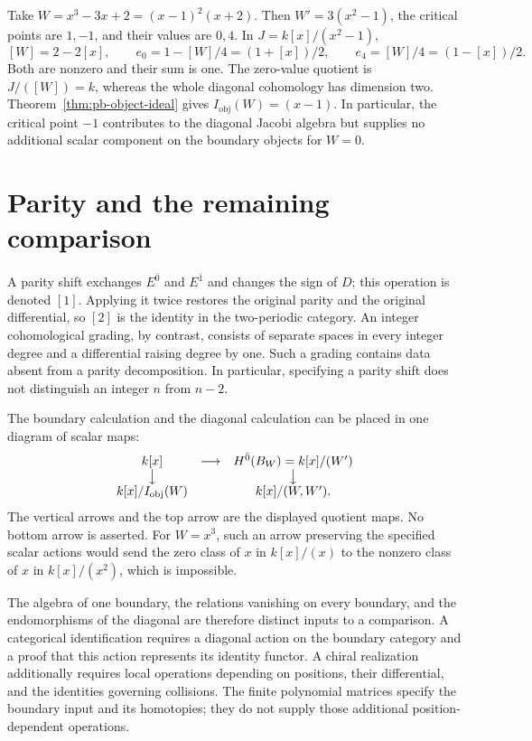 \begin{example}
\label{ex:pb-two-values}
Take \(W=x^3-3x+2=(x-1)^2(x+2)\).
Then \(W'=3(x^2-1)\), the critical points are \(1,-1\), and
their values are \(0,4\). In \(J=k[x]/(x^2-1)\),
\[
 [W]=2-2[x],\qquad
 e_0=1-[W]/4=(1+[x])/2,\qquad
 e_4=[W]/4=(1-[x])/2.
\]
Both are nonzero and their sum is one.
The zero-value quotient is \(J/([W])=k\), whereas
the whole diagonal cohomology has dimension two.
Theorem~\ref{thm:pb-object-ideal} gives
\(I_{\mathrm{obj}}(W)=(x-1)\). In particular, the critical point
\(-1\) contributes to the diagonal Jacobi algebra but supplies
no additional scalar component on the boundary objects for \(W=0\).
\end{example}

\section{Parity and the remaining comparison}
\label{sec:pb-parity-comparison}

A parity shift exchanges \(E^{\bar0}\) and \(E^{\bar1}\) and changes
the sign of \(D\); this operation is denoted \([1]\). Applying it
twice restores the original parity and the original differential,
so \([2]\) is the identity in the two-periodic category.
An integer cohomological grading, by contrast, consists of separate
spaces in every integer degree and a differential raising degree
by one. Such a grading contains data absent from a parity
decomposition. In particular, specifying a parity shift does not
distinguish an integer \(n\) from \(n-2\).

The boundary calculation and the diagonal calculation can be
placed in one diagram of scalar maps:
\[
\begin{array}{ccc}
 k[x] &\longrightarrow& H^{\bar0}(B_W)=k[x]/(W')\\
 \big\downarrow && \big\downarrow\\
 k[x]/I_{\mathrm{obj}}(W)&& k[x]/(W,W').
\end{array}
\]
The vertical arrows and the top arrow are the displayed quotient
maps. No bottom arrow is asserted. For \(W=x^3\), such an arrow
preserving the specified scalar actions would send the zero class
of \(x\) in \(k[x]/(x)\) to the nonzero class of \(x\) in
\(k[x]/(x^2)\), which is impossible.

The algebra of one boundary, the relations vanishing on every
boundary, and the endomorphisms of the diagonal are therefore
distinct inputs to a comparison. A categorical identification
requires a diagonal action on the boundary category and a proof
that this action represents its identity functor. A chiral
realization additionally requires local operations depending on
positions, their differential, and the identities governing
collisions. The finite polynomial matrices specify the boundary
input and its homotopies; they do not supply those additional
position-dependent operations.
